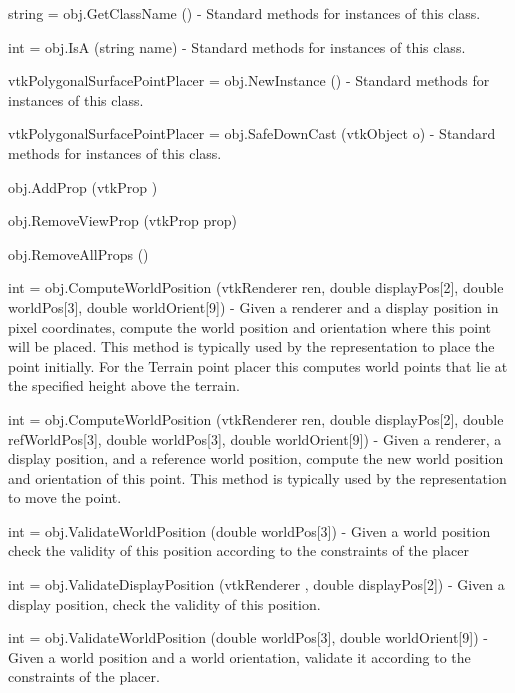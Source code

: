 \begin{DoxyItemize}
\item {\ttfamily string = obj.\-Get\-Class\-Name ()} -\/ Standard methods for instances of this class.  
\item {\ttfamily int = obj.\-Is\-A (string name)} -\/ Standard methods for instances of this class.  
\item {\ttfamily vtk\-Polygonal\-Surface\-Point\-Placer = obj.\-New\-Instance ()} -\/ Standard methods for instances of this class.  
\item {\ttfamily vtk\-Polygonal\-Surface\-Point\-Placer = obj.\-Safe\-Down\-Cast (vtk\-Object o)} -\/ Standard methods for instances of this class.  
\item {\ttfamily obj.\-Add\-Prop (vtk\-Prop )}  
\item {\ttfamily obj.\-Remove\-View\-Prop (vtk\-Prop prop)}  
\item {\ttfamily obj.\-Remove\-All\-Props ()}  
\item {\ttfamily int = obj.\-Compute\-World\-Position (vtk\-Renderer ren, double display\-Pos\mbox{[}2\mbox{]}, double world\-Pos\mbox{[}3\mbox{]}, double world\-Orient\mbox{[}9\mbox{]})} -\/ Given a renderer and a display position in pixel coordinates, compute the world position and orientation where this point will be placed. This method is typically used by the representation to place the point initially. For the Terrain point placer this computes world points that lie at the specified height above the terrain.  
\item {\ttfamily int = obj.\-Compute\-World\-Position (vtk\-Renderer ren, double display\-Pos\mbox{[}2\mbox{]}, double ref\-World\-Pos\mbox{[}3\mbox{]}, double world\-Pos\mbox{[}3\mbox{]}, double world\-Orient\mbox{[}9\mbox{]})} -\/ Given a renderer, a display position, and a reference world position, compute the new world position and orientation of this point. This method is typically used by the representation to move the point.  
\item {\ttfamily int = obj.\-Validate\-World\-Position (double world\-Pos\mbox{[}3\mbox{]})} -\/ Given a world position check the validity of this position according to the constraints of the placer  
\item {\ttfamily int = obj.\-Validate\-Display\-Position (vtk\-Renderer , double display\-Pos\mbox{[}2\mbox{]})} -\/ Given a display position, check the validity of this position.  
\item {\ttfamily int = obj.\-Validate\-World\-Position (double world\-Pos\mbox{[}3\mbox{]}, double world\-Orient\mbox{[}9\mbox{]})} -\/ Given a world position and a world orientation, validate it according to the constraints of the placer.  

\end{DoxyItemize}
